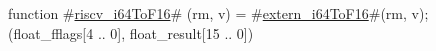 function #\hyperref[sailRISCVzriscvzyi64ToF16]{riscv\_i64ToF16}# (rm, v) = {
  #\hyperref[sailRISCVzexternzyi64ToF16]{extern\_i64ToF16}#(rm, v);
  (float_fflags[4 .. 0], float_result[15 .. 0])
}
